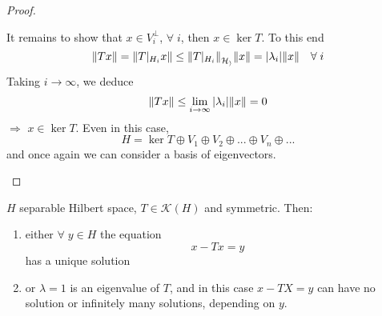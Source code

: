 \begin{proof}
\begin{itemize}
        It remains to show that \(x \in V_i^\perp\), \(\forall\; i\), then \(x \in \ker T\). To this end
        \[
            \norm{Tx} = \norm{T|_{H_i} x} \leq \norm{T|_{H_i}}_{\mathcal{H_i}} \norm{x} = \abs{\lambda_i} \norm{x} \quad \forall\;i 
        \]
        Taking \(i \to \infty\), we deduce
        \[
            \norm{Tx} \leq \lim_{i \to \infty} \abs{\lambda_i} \norm{x} = 0
        \]
        \(\Rightarrow\) \(x \in \ker T\). Even in this case, 
        \[
            H = \ker T \oplus V_1 \oplus V_2 \oplus ... \oplus V_n \oplus ...
        \]
        and once again we can consider a basis of eigenvectors.
    \end{itemize}
\end{proof}

\begin{corollary}
    \(H\) separable Hilbert space, \(T \in \mathcal{K}(H) \) and symmetric. Then:
    \begin{enumerate}
        \item either \(\forall\; y \in H\) the equation
        \[
            x - Tx = y
        \]
        has a unique solution
        \item or \(\lambda=1\) is an eigenvalue of \(T\), and in this case \(x - TX = y\) can have no solution or infinitely many solutions, depending on \(y\).
    \end{enumerate}
\end{corollary}

